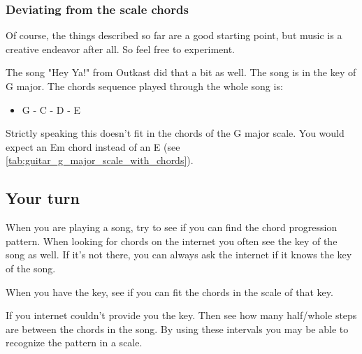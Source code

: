 \newpage

\subsubsection{Deviating from the scale chords}

Of course, the things described so far are a good starting point, but music is a creative endeavor after all. So feel free to experiment.

The song "Hey Ya!" from Outkast did that a bit as well. The song is in the key of G major. The chords sequence played through the whole song is:
\begin{itemize}
	\item G - C - D - E
\end{itemize}

Strictly speaking this doesn't fit in the chords of the G major scale. You would expect an Em chord instead of an E (see \autoref{tab:guitar_g_major_scale_with_chords}).

\subsection{Your turn}

When you are playing a song, try to see if you can find the chord progression pattern. When looking for chords on the internet you often see the key of the song as well. If it's not there, you can always ask the internet if it knows the key of the song.

When you have the key, see if you can fit the chords in the scale of that key.

If you internet couldn't provide you the key. Then see how many half/whole steps are between the chords in the song. By using these intervals you may be able to recognize the pattern in a scale.

